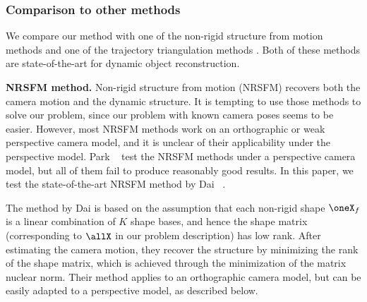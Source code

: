  

 
\subsubsection{Comparison to other methods}
We compare our method with one of the non-rigid structure from motion methods \cite{dai2014simple} and one of the trajectory triangulation methods \cite{Valmadre_CVPR2012}. Both of these methods are state-of-the-art for dynamic object reconstruction.

\textbf{NRSFM method.} Non-rigid structure from motion (NRSFM) recovers both the camera motion and the dynamic structure. It is tempting to use those methods to solve our problem, since our problem with known camera poses seems to be easier. 
However, most NRSFM methods work on an orthographic or weak perspective camera model, and it is unclear of their applicability under the perspective model. Park \etal~\cite{Park_ECCV2010} test the NRSFM methods \cite{Akhter_NIPS08,torresani2008nonrigid,paladini2009factorization} under a perspective camera model, but all of them fail to produce reasonably good results. In this paper, we test the state-of-the-art NRSFM method by Dai \etal~\cite{dai2014simple}.

The method by Dai \etal \cite{dai2014simple} is based on the assumption that each non-rigid shape $\oneX_f$ is a linear combination of $K$ shape bases, and hence the shape matrix (corresponding to $\allX$ in our problem description) has low rank.
After estimating the camera motion,  they recover the structure by minimizing the rank of the shape matrix, which is achieved through the minimization of the matrix nuclear norm.  Their method applies to an orthographic camera model, but can be easily adapted to a perspective model, as described below. 

